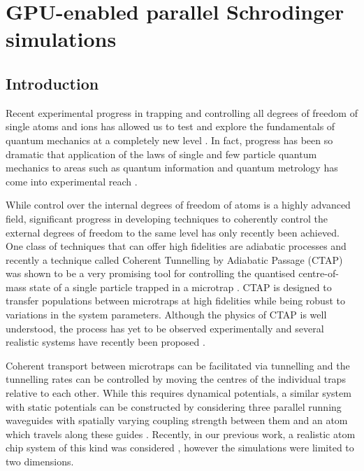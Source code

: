 \section{GPU-enabled parallel Schrodinger simulations}
\label{sec:3D Stirap parallel Schrodinger simulations}

\subsection{Introduction}
\label{sec:Introduction}
Recent experimental progress in trapping and controlling all degrees of freedom of single atoms and ions has allowed us to test and
explore the fundamentals of quantum mechanics at a completely new level \cite{Chen:11,Bergmann:98}. In fact, progress has been so dramatic that application of the laws of single and few particle quantum mechanics to areas such as quantum information and quantum metrology has come into experimental reach \cite{Nielsen:00,Riedel:10}.

While control over the internal degrees of freedom of atoms is a highly advanced field, significant progress in developing techniques to coherently control the external degrees of freedom to the same level has only recently been achieved. One class of techniques that can offer high fidelities are adiabatic processes and recently a technique called Coherent Tunnelling by Adiabatic Passage (CTAP) was shown to be a very promising tool for controlling the quantised centre-of-mass state of a single particle trapped in a microtrap \cite{Eckert:04}. CTAP is designed to transfer populations between microtraps at high fidelities while being robust to variations in the system parameters. Although the physics of CTAP is well understood, the process has yet to be observed experimentally and several realistic systems have recently been proposed \cite{Eckert:06,Morgan:11,Kohler:13}.

Coherent transport between microtraps can be facilitated via tunnelling and the tunnelling rates  can be controlled by moving the centres of the individual traps relative to each other. While this requires dynamical potentials, a similar system with static potentials can be constructed by considering three parallel running waveguides with spatially varying coupling strength between them  and an atom which travels along these guides \cite{Eckert:06}. Recently, in our previous work, a realistic atom chip system of this kind was considered \cite{OSullivan:10}, however the simulations were limited to two dimensions.

